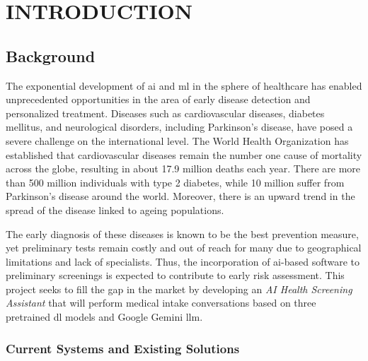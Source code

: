 \chapter{\MakeUppercase{Introduction}}
\justifying

\section{Background}

The exponential development of \ac{ai} and \ac{ml} in the sphere of healthcare has enabled unprecedented opportunities in the area of early disease detection and personalized treatment. Diseases such as cardiovascular diseases, diabetes mellitus, and neurological disorders, including Parkinson's disease, have posed a severe challenge on the international level. The World Health Organization has established that cardiovascular diseases remain the number one cause of mortality across the globe, resulting in about 17.9 million deaths each year. There are more than 500 million individuals with type 2 diabetes, while 10 million suffer from Parkinson's disease around the world. Moreover, there is an upward trend in the spread of the disease linked to ageing populations.

The early diagnosis of these diseases is known to be the best prevention measure, yet preliminary tests remain costly and out of reach for many due to geographical limitations and lack of specialists. Thus, the incorporation of \ac{ai}-based software to preliminary screenings is expected to contribute to early risk assessment. This project seeks to fill the gap in the market by developing an \textit{AI Health Screening Assistant} that will perform medical intake conversations based on three pretrained \ac{dl} models and Google Gemini \ac{llm}.

\subsection{Current Systems and Existing Solutions}

